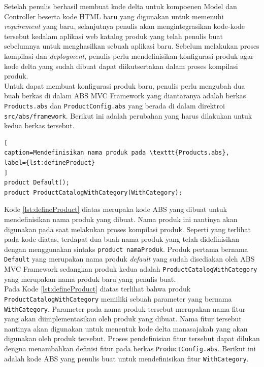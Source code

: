 Setelah penulis berhasil membuat kode delta untuk kompoenen Model dan Controller beserta kode HTML baru yang digunakan untuk memenuhi \textit{requirement} yang baru, selanjutnya penulis akan mengintegrasikan kode-kode tersebut kedalam aplikasi web katalog produk yang telah penulis buat sebelumnya untuk menghasilkan sebuah aplikasi baru. Sebelum melakukan proses kompilasi dan \textit{deployment}, penulis perlu mendefinisikan konfigurasi produk agar kode delta yang sudah dibuat dapat diikutsertakan dalam proses kompilasi produk.\\

Untuk dapat membuat konfigurasi produk baru, penulis perlu mengubah dua buah berkas di dalam ABS MVC Framework yang diantaranya adalah berkas \texttt{Products.abs} dan \texttt{ProductConfig.abs} yang berada di dalam direktroi \texttt{src/abs/framework}. Berikut ini adalah perubahan yang harus dilakukan untuk kedua berkas tersebut.

\begin{lstlisting}[
caption=Mendefinisikan nama produk pada \texttt{Products.abs},
label={lst:defineProduct}
]
product Default();
product ProductCatalogWithCategory(WithCategory);
\end{lstlisting}

Kode \ref{lst:defineProduct} diatas merupaka kode ABS yang dibuat untuk mendefinisikan nama produk yang dibuat. Nama produk ini nantinya akan digunakan pada saat melakukan proses kompilasi produk. Seperti yang terlihat pada kode diatas, terdapat dua buah nama produk yang telah didefinisikan dengan menggunakan sintaks \texttt{product namaProduk}. Produk pertama bernama \texttt{Default} yang merupakan nama produk \textit{default} yang sudah disediakan oleh ABS MVC Framework sedangkan produk kedua adalah \texttt{ProductCatalogWithCategory} yang merupakan nama produk baru yang penulis buat.\\

Pada Kode \ref{lst:defineProduct} diatas terlihat bahwa produk \texttt{ProductCatalogWithCategory} memiliki sebuah parameter yang bernama \texttt{WithCategory}. Parameter pada nama produk tersebut merupakan nama fitur yang akan diimplementasikan oleh produk yang dibuat. Nama fitur tersebut nantinya akan digunakan untuk menentuk kode delta manasajakah yang akan digunakan oleh produk tersebut. Proses pendefinisian fitur tersebut dapat dilukan dengna menambahkan definisi fitur pada berkas \texttt{ProductConfig.abs}. Berikut ini adalah kode ABS yang penulis buat untuk mendefinisikan fitur \texttt{WithCategory}.

